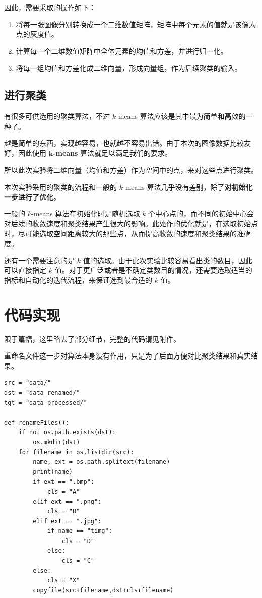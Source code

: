 \documentclass[a4paper, 12pt]{article}
\begin{document}
因此，需要采取的操作如下：

\begin{enumerate}[leftmargin=*,labelindent=2em]
\item 将每一张图像分别转换成一个二维数值矩阵，矩阵中每个元素的值就是该像素点的灰度值。
\item 计算每一个二维数值矩阵中全体元素的均值和方差，并进行归一化。
\item 将每一组均值和方差化成二维向量，形成向量组，作为后续聚类的输入。
\end{enumerate}


\subsection{进行聚类}
有很多可供选用的聚类算法，不过 $k$-means 算法应该是其中最为简单和高效的一种了。

越是简单的东西，实现越容易，也就越不容易出错。由于本次的图像数据比较友好，因此使用 \textbf{$\mathbf{k}$-means} 算法就足以满足我们的要求。

所以此次实验将二维向量（均值和方差）作为空间中的点，来对这些点进行聚类。

本次实验采用的聚类的流程和一般的 $k$-means 算法几乎没有差别，除了\textbf{对初始化一步进行了优化}。

一般的 $k$-means 算法在初始化时是随机选取 $k$ 个中心点的，而不同的初始中心会对后续的收敛速度和聚类结果产生很大的影响。此处作的优化就是，在选取初始点时，尽可能选取空间距离较大的那些点，从而提高收敛的速度和聚类结果的准确度。

还有一个需要注意的是 $k$ 值的选取。由于此次实验比较容易看出类的数目，因此可以直接指定 $k$ 值。对于更广泛或者是不确定类数目的情况，还需要选取适当的指标和自动化的迭代流程，来保证选到最合适的 $k$ 值。

\section{代码实现}
限于篇幅，这里略去了部分细节，完整的代码请见附件。

重命名文件这一步对算法本身没有作用，只是为了后面方便对比聚类结果和真实结果。

\begin{lstlisting}[style=myPython,caption={重命名文件}]
src = "data/"
dst = "data_renamed/"
tgt = "data_processed/"

def renameFiles():
    if not os.path.exists(dst): 
        os.mkdir(dst)
    for filename in os.listdir(src):
        name, ext = os.path.splitext(filename)
        print(name)
        if ext == ".bmp":
            cls = "A"
        elif ext == ".png":
            cls = "B"
        elif ext == ".jpg":
            if name == "timg":
                cls = "D"
            else:
                cls = "C"
        else:
            cls = "X"
        copyfile(src+filename,dst+cls+filename)
\end{lstlisting}
\end{document}
